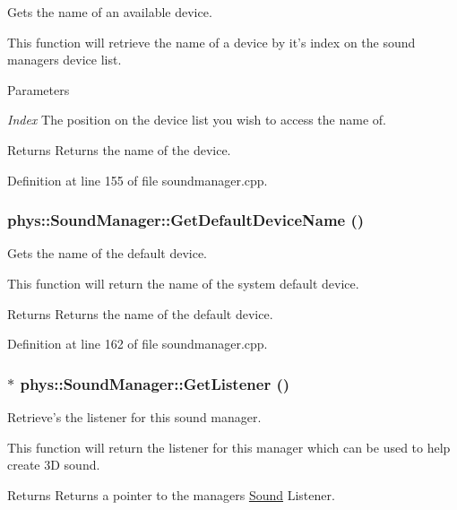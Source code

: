 Gets the name of an available device. 

This function will retrieve the name of a device by it's index on the sound managers device list. 
\begin{DoxyParams}{Parameters}
\item[{\em Index}]The position on the device list you wish to access the name of. \end{DoxyParams}
\begin{DoxyReturn}{Returns}
Returns the name of the device. 
\end{DoxyReturn}


Definition at line 155 of file soundmanager.cpp.

\hypertarget{classphys_1_1SoundManager_ac4814331683597034b26fac5c1c69bfa}{
\subsubsection[{GetDefaultDeviceName}]{ phys::SoundManager::GetDefaultDeviceName ()}}
\label{d1/dc4/classphys_1_1SoundManager_ac4814331683597034b26fac5c1c69bfa}


Gets the name of the default device. 

This function will return the name of the system default device. \begin{DoxyReturn}{Returns}
Returns the name of the default device. 
\end{DoxyReturn}


Definition at line 162 of file soundmanager.cpp.

\hypertarget{classphys_1_1SoundManager_af0c700e283c44c20466185e1150fc6a3}{
\subsubsection[{GetListener}]{ $\ast$ phys::SoundManager::GetListener ()}}
\label{d1/dc4/classphys_1_1SoundManager_af0c700e283c44c20466185e1150fc6a3}


Retrieve's the listener for this sound manager. 

This function will return the listener for this manager which can be used to help create 3D sound. \begin{DoxyReturn}{Returns}
Returns a pointer to the managers \hyperlink{classphys_1_1Sound}{Sound} Listener. 
\end{DoxyReturn}


